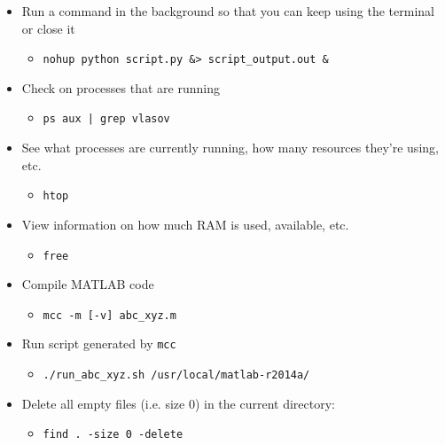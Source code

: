 \documentclass[11pt,a4paper]{report}
\begin{document}
\begin{itemize}

\item Run a command in the background so that you can keep using the terminal or close it
  \begin{itemize}
  \item \texttt{nohup python script.py \&> script\_output.out \&}
  \end{itemize}

\item Check on processes that are running
  \begin{itemize}
  \item \texttt{ps aux | grep vlasov}
  \end{itemize}

\item See what processes are currently running, how many resources they're using, etc.
  \begin{itemize}
  \item \texttt{htop}
  \end{itemize}

\item View information on how much RAM is used, available, etc.
  \begin{itemize}
  \item \texttt{free}
  \end{itemize}

\item Compile MATLAB code
  \begin{itemize}
  \item \texttt{mcc -m [-v] abc\_xyz.m}
  \end{itemize}

\item Run script generated by \texttt{mcc}
  \begin{itemize}
  \item \texttt{./run\_abc\_xyz.sh /usr/local/matlab-r2014a/}
  \end{itemize}

\item Delete all empty files (i.e. size 0) in the current directory:
  \begin{itemize}
  \item \texttt{find . -size 0 -delete}
  \end{itemize}

\end{itemize}
\end{document}
